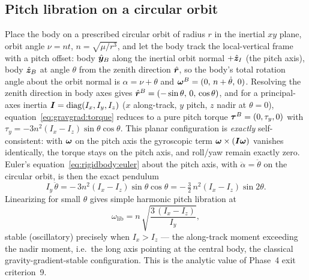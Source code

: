 \subsection{Pitch libration on a circular orbit}
\label{sec:gravgrad:libration}

Place the body on a prescribed circular orbit of radius $r$ in the
inertial $xy$ plane, orbit angle $\nu = n t$, $n = \sqrt{\mu/r^3}$, and
let the body track the local-vertical frame with a pitch offset: body
$\hat{\bm{y}}_B$ along the inertial orbit normal $+\hat{\bm{z}}_I$ (the
pitch axis), body $\hat{\bm{z}}_B$ at angle $\theta$ from the zenith
direction $\hat{\bm{r}}$, so the body's total rotation angle about the
orbit normal is $\alpha = \nu + \theta$ and $\bm{\omega}^{B} = (0,\,
n + \dot{\theta},\, 0)$. Resolving the zenith direction in body axes
gives $\hat{\bm{r}}^{B} = (-\sin\theta,\, 0,\, \cos\theta)$, and for a
principal-axes inertia $\bm{I} = \mathrm{diag}(I_x, I_y, I_z)$ ($x$
along-track, $y$ pitch, $z$ nadir at $\theta = 0$),
equation~\eqref{eq:gravgrad:torque} reduces to a pure pitch torque
$\bm{\tau}^{B} = (0, \tau_y, 0)$ with $\tau_y = -3 n^2 (I_x - I_z)
\sin\theta \cos\theta$. This planar configuration is \emph{exactly}
self-consistent: with $\bm{\omega}$ on the pitch axis the gyroscopic term
$\bm{\omega} \times (\bm{I}\bm{\omega})$ vanishes identically, the
torque stays on the pitch axis, and roll/yaw remain exactly zero.
Euler's equation~\eqref{eq:rigidbody:euler} about the pitch axis, with
$\ddot{\alpha} = \ddot{\theta}$ on the circular orbit, is then the exact
pendulum
\begin{equation}
  I_y\, \ddot{\theta}
    = -\,3 n^2 (I_x - I_z) \sin\theta \cos\theta
    = -\,\tfrac{3}{2}\, n^2 (I_x - I_z) \sin 2\theta .
  \label{eq:gravgrad:pitch}
\end{equation}
Linearizing for small $\theta$ gives simple harmonic pitch libration at
\begin{equation}
  \boxed{\;
  \omega_{\mathrm{lib}}
    = n\, \sqrt{\frac{3\,(I_x - I_z)}{I_y}} ,
  \;}
  \label{eq:gravgrad:libfreq}
\end{equation}
stable (oscillatory) precisely when $I_x > I_z$ --- the along-track moment
exceeding the nadir moment, i.e.\ the long axis pointing at the central
body, the classical gravity-gradient-stable configuration. This is the
analytic value of Phase~4 exit criterion~9.

